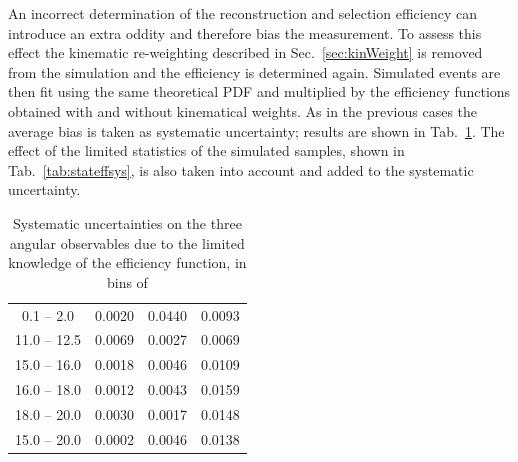 An incorrect determination of the reconstruction and selection efficiency can introduce an extra oddity
and therefore bias the measurement. To assess this effect the kinematic re-weighting described in Sec.~\ref{sec:kinWeight}
is removed from the simulation and the efficiency is determined again.
Simulated events are then fit using the same theoretical PDF and multiplied by the efficiency
functions obtained with and without kinematical weights. As in the previous cases the average bias 
is taken as systematic uncertainty; results are shown in Tab.~\ref{tab:AfbeffSys}.
The effect of the limited statistics of the simulated samples, shown in Tab.~\ref{tab:stateffsys}, is also taken into account and 
added to the systematic uncertainty.
%
%
\begin{table}[h]
\centering
\caption{Systematic uncertainties on the three angular observables due to the limited knowledge 
of the efficiency function, in bins of \qsq}
\begin{tabular}{c|ccc}
 \boldmath{ \qsq [\gevgevcccc] }  &  \boldmath{ \afbl }   &  \boldmath{ \fl} &  \boldmath{ \afbh} \\ \hline
\phantom{x}0.1 -- 2.0\phantom{x}    	 & 0.0020  & 0.0440 &  0.0093\\ 
11.0 -- 12.5  					 & 0.0069  & 0.0027 &  0.0069\\
15.0 -- 16.0  					 & 0.0018  & 0.0046 &  0.0109\\
16.0 -- 18.0  					 & 0.0012  & 0.0043 &  0.0159\\
18.0 -- 20.0  					 & 0.0030  & 0.0017 &  0.0148\\
\hline
15.0 -- 20.0  					 & 0.0002  & 0.0046 &  0.0138\\
\end{tabular}
\label{tab:AfbeffSys}
\end{table}
